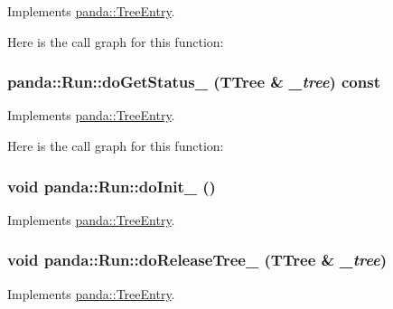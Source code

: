 Implements \hyperlink{classpanda_1_1TreeEntry_a62e77d9db1eec7032b1e31e5edc78a10}{panda::TreeEntry}.

Here is the call graph for this function:\hypertarget{classpanda_1_1Run_a624aa12a6f703dbedea314cf69f1f04f}{
\subsubsection[{doGetStatus\_\-}]{ panda::Run::doGetStatus\_\- (TTree \& {\em \_\-tree}) const}}
\label{classpanda_1_1Run_a624aa12a6f703dbedea314cf69f1f04f}


Implements \hyperlink{classpanda_1_1TreeEntry_a649d4a6f2719b68d54c6a7505f5f3105}{panda::TreeEntry}.

Here is the call graph for this function:\hypertarget{classpanda_1_1Run_ab2308a77944053b5ad6939cb3e63041f}{
\subsubsection[{doInit\_\-}]{\setlength{\rightskip}{0pt plus 5cm}void panda::Run::doInit\_\- ()}}
\label{classpanda_1_1Run_ab2308a77944053b5ad6939cb3e63041f}


Implements \hyperlink{classpanda_1_1TreeEntry_ab78cd4dfd6c017222db541580983fb65}{panda::TreeEntry}.\hypertarget{classpanda_1_1Run_a8a59dc2c95b3a5e3bc43040c119320cd}{
\subsubsection[{doReleaseTree\_\-}]{\setlength{\rightskip}{0pt plus 5cm}void panda::Run::doReleaseTree\_\- (TTree \& {\em \_\-tree})}}
\label{classpanda_1_1Run_a8a59dc2c95b3a5e3bc43040c119320cd}


Implements \hyperlink{classpanda_1_1TreeEntry_a44e70436de0dc8088885895ea0011a2d}{panda::TreeEntry}.

